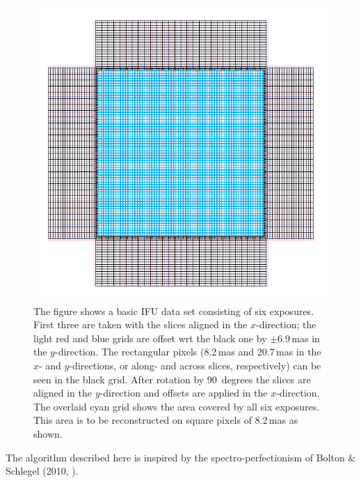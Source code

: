 \begin{figure}
    \centering
    \includegraphics{op_concept.pdf}
    \caption[Overlaid model and data pixel grids]{The figure shows a basic IFU data set consisting of six
        exposures. First three are taken with the slices aligned in the
        $x$-direction; the light red and blue grids are offset wrt the black
        one by $\pm 6.9\,$mas in the $y$-direction. The rectangular pixels
        (8.2\,mas and 20.7\,mas in the $x$- and $y$-directions, or along- and
        across slices, respectively) can be seen in the black grid. After
        rotation by 90~degrees the slices are aligned in the $y$-direction
        and offsets are applied in the $x$-direction.  The overlaid cyan
        grid shows the area covered by all six exposures. This area is to
        be reconstructed on square pixels of 8.2\,mas as shown.
    }
    \label{fig:op_concept}
\end{figure}

The algorithm described here is inspired by the spectro-perfectionism of Bolton \& Schlegel (2010, \cite{bs10}).

